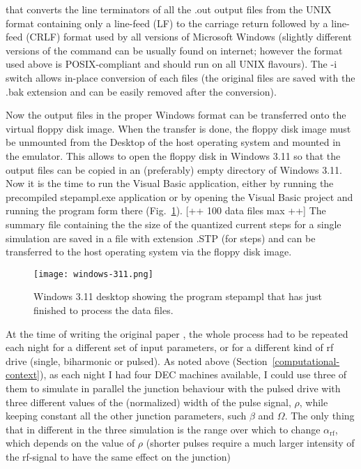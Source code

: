 that converts the line terminators of all the \textsf{.out} output files from the UNIX format containing only a line-feed (LF) to the carriage return followed by a line-feed (CRLF) format used by all versions of Microsoft Windows (slightly different versions of the command can be usually found on internet; however the format used above is POSIX-compliant and should run on all UNIX flavours). The \textsf{-i} switch allows in-place conversion of each files (the original files are saved with the \textsf{.bak} extension and can be easily removed after the conversion).

Now the output files in the proper Windows format can be transferred onto the virtual floppy disk image. %
When the transfer is done, the floppy disk image must be unmounted from the Desktop of the host operating system and mounted in the emulator. This allows to open the floppy disk in Windows 3.11 so that the output files can be copied in an (preferably) empty directory of Windows 3.11. 
Now it is the time to run the Visual Basic application, either by running the precompiled \textsf{stepampl.exe} application or by opening the Visual Basic project and running the program form there (Fig.~\ref{fig:stepampl}). [++ 100 data files max ++] 
The summary file containing the the size of the quantized current steps for a single simulation are saved in a file with extension \textsf{.STP} (for steps) and can be transferred to the host operating system via the floppy disk image.

\begin{figure}[tbh]
	\centering
	\texttt{[image: windows-311.png]}
	\caption{Windows 3.11 desktop showing the program \textsf{stepampl} that has just finished to process the data files.}
	\label{fig:stepampl}
\end{figure}

At the time of writing the original paper \cite{Maggi:1996}, the whole process had to be repeated each night for a different set of input parameters,  or for a different kind of rf drive (single, biharmonic or pulsed). As noted above (Section~\ref{computational-context}), as each night I had four DEC machines  available, I could use three of them to simulate in parallel the junction behaviour with the pulsed drive with three different values of the (normalized) width of the pulse signal, $\rho$, while keeping constant all the other junction parameters, such $\beta$ and $\Omega$.
The only thing that in different in the three simulation is the range over which to change $\alpha_\mathrm{rf}$, which depends on the value of $\rho$ (shorter pulses require a much larger intensity of the rf-signal to have the same effect on the junction)

